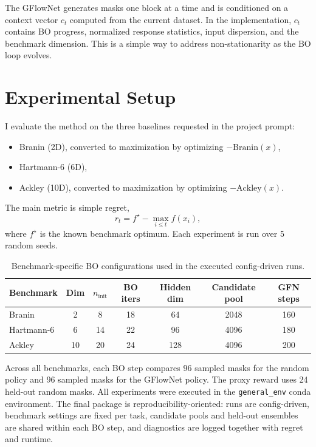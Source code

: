 \documentclass{article}
\begin{document}
The GFlowNet generates masks one block at a time and is conditioned on a context vector $c_t$ computed from the current dataset. In the implementation, $c_t$ contains BO progress, normalized response statistics, input dispersion, and the benchmark dimension. This is a simple way to address non-stationarity as the BO loop evolves.

\section{Experimental Setup}

I evaluate the method on the three baselines requested in the project prompt:

\begin{itemize}
    \item Branin (2D), converted to maximization by optimizing $-\mathrm{Branin}(x)$,
    \item Hartmann-6 (6D),
    \item Ackley (10D), converted to maximization by optimizing $-\mathrm{Ackley}(x)$.
\end{itemize}

The main metric is simple regret,
\[
r_t = f^\star - \max_{i \le t} f(x_i),
\]
where $f^\star$ is the known benchmark optimum. Each experiment is run over 5 random seeds.

\begin{table}[t]
\centering
\caption{Benchmark-specific BO configurations used in the executed config-driven runs.}
\label{tab:configs}
\small
\begin{tabular}{lcccccc}
\toprule
Benchmark & Dim & $n_{\text{init}}$ & BO iters & Hidden dim & Candidate pool & GFN steps \\
\midrule
Branin & 2 & 8 & 18 & 64 & 2048 & 160 \\
Hartmann-6 & 6 & 14 & 22 & 96 & 4096 & 180 \\
Ackley & 10 & 20 & 24 & 128 & 4096 & 200 \\
\bottomrule
\end{tabular}
\end{table}

Across all benchmarks, each BO step compares 96 sampled masks for the random policy and 96 sampled masks for the GFlowNet policy. The proxy reward uses 24 held-out random masks. All experiments were executed in the \texttt{general\_env} conda environment. The final package is reproducibility-oriented: runs are config-driven, benchmark settings are fixed per task, candidate pools and held-out ensembles are shared within each BO step, and diagnostics are logged together with regret and runtime.
\end{document}
